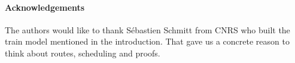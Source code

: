 \documentclass[runningheads]{llncs}
\begin{document}
\paragraph{Acknowledgements} The authors would like to thank Sébastien Schmitt from CNRS who built the train model mentioned in the introduction. That gave us a concrete reason to think about routes, scheduling and proofs. 



\end{document}
